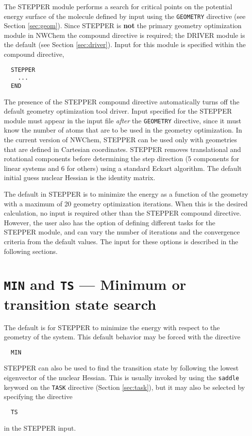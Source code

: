 \label{sec:stepper}

The STEPPER module performs a search for critical points on the
potential energy surface of the molecule defined by input using the
\verb+GEOMETRY+ directive (see Section \ref{sec:geom}).  Since STEPPER
is {\bf not} the primary geometry optimization module in NWChem the
compound directive is required; the DRIVER module is the default (see
Section {\ref{sec:driver}}).  Input for this module is
specified within the compound directive,

\begin{verbatim}
  STEPPER
    ...
  END
\end{verbatim}

The presence of the STEPPER compound directive automatically turns off
the default geometry optimization tool driver. Input specified for the
STEPPER module must appear in the input file {\em after} the
\verb+GEOMETRY+ directive, since it must know the number of atoms that
are to be used in the geometry optimization.  In the current version
of NWChem, STEPPER can be used only with geometries that are defined
in Cartesian coordinates.  STEPPER removes translational and
rotational components before determining the step direction (5
components for linear systems and 6 for others) using a standard
Eckart algorithm.  The default initial guess nuclear Hessian is the
identity matrix.

The default in STEPPER is to minimize the energy as a function of the
geometry with a maximum of 20 geometry optimization iterations.  When
this is the desired calculation, no input is required other than the
STEPPER compound directive.  However, the user also has the option of
defining different tasks for the STEPPER module, and can vary the
number of iterations and the convergence criteria from the default
values.  The input for these options is described in the following
sections.

\section{{\tt MIN} and {\tt TS} --- Minimum or transition state search}

The default is for STEPPER to minimize the energy with respect to the
geometry of the system.  This default behavior may be forced with the
directive
\begin{verbatim}
  MIN
\end{verbatim}

STEPPER can also be used to find the transition state by following the
lowest eigenvector of the nuclear Hessian.  This is usually invoked 
by using the \verb+saddle+ keyword on the \verb+TASK+ directive
(Section \ref{sec:task}), but it may also be selected by specifying
the directive
\begin{verbatim}
  TS
\end{verbatim}
in the STEPPER input. 

